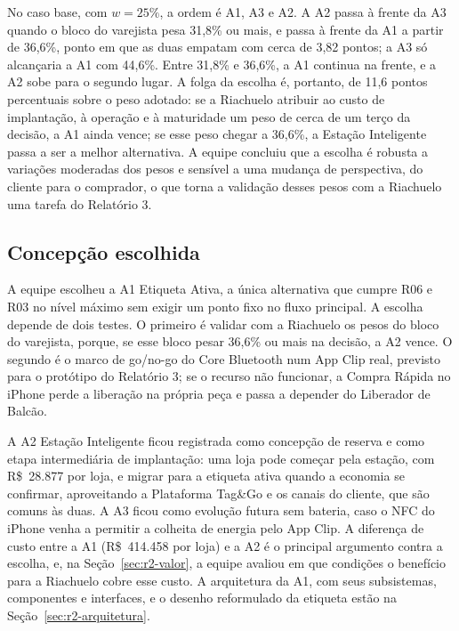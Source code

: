 No caso base, com $w = 25\%$, a ordem é A1, A3 e A2. A A2 passa à frente da A3 quando o bloco do varejista pesa 31,8\% ou mais, e passa à frente da A1 a partir de 36,6\%, ponto em que as duas empatam com cerca de 3,82 pontos; a A3 só alcançaria a A1 com 44,6\%. Entre 31,8\% e 36,6\%, a A1 continua na frente, e a A2 sobe para o segundo lugar. A folga da escolha é, portanto, de 11,6 pontos percentuais sobre o peso adotado: se a Riachuelo atribuir ao custo de implantação, à operação e à maturidade um peso de cerca de um terço da decisão, a A1 ainda vence; se esse peso chegar a 36,6\%, a Estação Inteligente passa a ser a melhor alternativa. A equipe concluiu que a escolha é robusta a variações moderadas dos pesos e sensível a uma mudança de perspectiva, do cliente para o comprador, o que torna a validação desses pesos com a Riachuelo uma tarefa do Relatório 3.

\subsection{Concepção escolhida}

A equipe escolheu a A1 Etiqueta Ativa, a única alternativa que cumpre R06 e R03 no nível máximo sem exigir um ponto fixo no fluxo principal. A escolha depende de dois testes. O primeiro é validar com a Riachuelo os pesos do bloco do varejista, porque, se esse bloco pesar 36,6\% ou mais na decisão, a A2 vence. O segundo é o marco de go/no-go do Core Bluetooth num App Clip real, previsto para o protótipo do Relatório 3; se o recurso não funcionar, a Compra Rápida no iPhone perde a liberação na própria peça e passa a depender do Liberador de Balcão.

A A2 Estação Inteligente ficou registrada como concepção de reserva e como etapa intermediária de implantação: uma loja pode começar pela estação, com R\$~28.877 por loja, e migrar para a etiqueta ativa quando a economia se confirmar, aproveitando a Plataforma Tag\&Go e os canais do cliente, que são comuns às duas. A A3 ficou como evolução futura sem bateria, caso o NFC do iPhone venha a permitir a colheita de energia pelo App Clip. A diferença de custo entre a A1 (R\$~414.458 por loja) e a A2 é o principal argumento contra a escolha, e, na Seção~\ref{sec:r2-valor}, a equipe avaliou em que condições o benefício para a Riachuelo cobre esse custo. A arquitetura da A1, com seus subsistemas, componentes e interfaces, e o desenho reformulado da etiqueta estão na Seção~\ref{sec:r2-arquitetura}.
